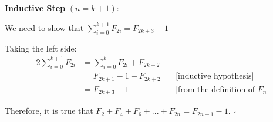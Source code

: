 \documentclass{article} %
\begin{document}
    \textbf{Inductive Step} $(n = k + 1)$:

    We need to show that $\sum_{i = 0}^{k + 1} F_{2i} = F_{2k + 3} - 1$
    
    Taking the left side:
    \begin{alignat*}{2}
        \sum_{i = 0}^{k + 1} F_{2i} &= \sum_{i = 0}^{k} F_{2i} + F_{2k + 2}\\
        &= F_{2k+1} - 1 + F_{2k + 2}\ &&\text{[inductive hypothesis]}\\
        &= F_{2k + 3} - 1\ &&\text{[from the definition of $F_n$]}
    \end{alignat*}

    Therefore, it is true that $F_2 + F_4 + F_6 + ... + F_{2n} = F_{2n + 1} - 1$. $\square$

    
\end{document}
